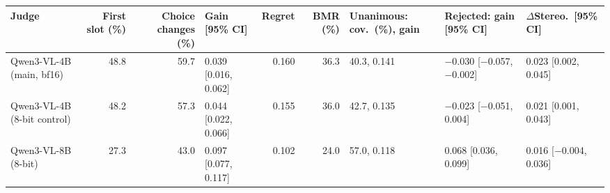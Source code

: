 \begin{tabular}{lrrlrrlll}
\toprule
Judge & First slot (\%) & Choice changes (\%) & Gain [95\% CI] & Regret & BMR (\%) & Unanimous: cov.\ (\%), gain & Rejected: gain [95\% CI] & $\Delta$Stereo.\ [95\% CI]\\
\midrule
Qwen3-VL-4B (main, bf16) & 48.8 & 59.7 & 0.039 [0.016, 0.062] & 0.160 & 36.3 & 40.3, 0.141 & $-$0.030 [$-$0.057, $-$0.002] & 0.023 [0.002, 0.045]\\
Qwen3-VL-4B (8-bit control) & 48.2 & 57.3 & 0.044 [0.022, 0.066] & 0.155 & 36.0 & 42.7, 0.135 & $-$0.023 [$-$0.051, 0.004] & 0.021 [0.001, 0.043]\\
Qwen3-VL-8B (8-bit) & 27.3 & 43.0 & 0.097 [0.077, 0.117] & 0.102 & 24.0 & 57.0, 0.118 & 0.068 [0.036, 0.099] & 0.016 [$-$0.004, 0.036]\\
\bottomrule
\end{tabular}
